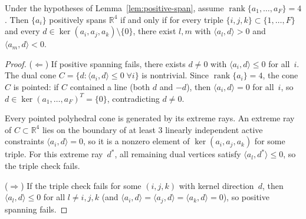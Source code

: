 \begin{unverified}
\begin{lemma}\label{lem:bounded-triples}
Under the hypotheses of Lemma~\ref{lem:positive-span}, assume
$\operatorname{rank}\{a_1, \ldots, a_F\} = 4$.
Then $\{a_i\}$ positively spans $\mathbb{R}^4$ if and only if for every
triple $\{i,j,k\} \subset \{1,\ldots,F\}$ and every
$d \in \ker(a_i, a_j, a_k) \setminus \{0\}$, there exist $l, m$ with
$\langle a_l, d \rangle > 0$ and $\langle a_m, d \rangle < 0$.
\end{lemma}

\begin{proof}
($\Leftarrow$) If positive spanning fails, there exists $d \neq 0$ with
$\langle a_i, d \rangle \leq 0$ for all~$i$. The dual cone
$C = \{d : \langle a_i, d \rangle \leq 0 \;\forall i\}$ is nontrivial.
Since $\operatorname{rank}\{a_i\} = 4$, the cone $C$ is pointed: if $C$
contained a line (both $d$ and $-d$), then $\langle a_i, d \rangle = 0$
for all~$i$, so $d \in \ker(a_1, \ldots, a_F)^T = \{0\}$, contradicting
$d \neq 0$.

Every pointed polyhedral cone is generated by its extreme rays. An extreme
ray of $C \subset \mathbb{R}^4$ lies on the boundary of at least 3 linearly
independent active constraints $\langle a_i, d \rangle = 0$, so it is
a nonzero element of $\ker(a_i, a_j, a_k)$ for some triple.
For this extreme ray~$d^*$, all remaining dual vertices satisfy
$\langle a_l, d^* \rangle \leq 0$, so the triple check fails.

($\Rightarrow$) If the triple check fails for some $(i,j,k)$ with
kernel direction~$d$, then $\langle a_l, d \rangle \leq 0$ for all
$l \neq i,j,k$ (and $\langle a_i, d \rangle = \langle a_j, d \rangle
= \langle a_k, d \rangle = 0$), so positive spanning fails.
\end{proof}
\end{unverified}


